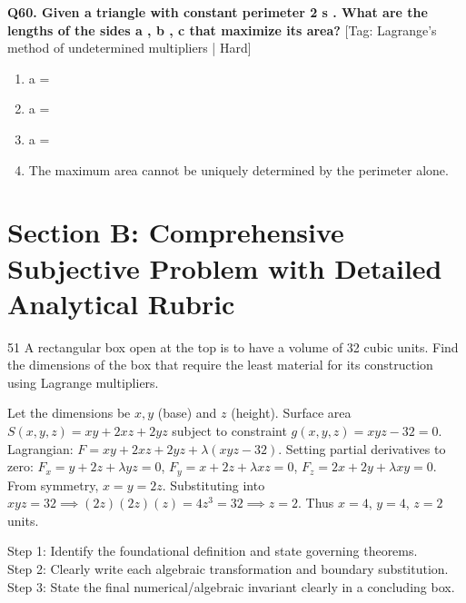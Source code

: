 \noindent\textbf{Q60. Given a triangle with constant perimeter 2 s . What are the lengths of the sides a , b , c that maximize its area?} \hfill [Tag: Lagrange's method of undetermined multipliers | Hard]
\begin{enumerate}[label=(\alph*),topsep=2pt,itemsep=1pt,partopsep=0pt,parsep=0pt]
    \item {{a =}}
    \item {{a =}}
    \item {{a =}}
    \item {{The maximum area cannot be uniquely determined by the perimeter alone.}}
\end{enumerate}
\vspace{2mm}


\section{Section B: Comprehensive Subjective Problem with Detailed Analytical Rubric}

\begin{subjectiveq}{5}{1}
A rectangular box open at the top is to have a volume of 32 cubic units. Find the dimensions of the box that require the least material for its construction using Lagrange multipliers.
\end{subjectiveq}

\begin{solbox}
Let the dimensions be $x, y$ (base) and $z$ (height). Surface area $S(x,y,z) = xy + 2xz + 2yz$ subject to constraint $g(x,y,z) = xyz - 32 = 0$. Lagrangian: $F = xy + 2xz + 2yz + \lambda(xyz - 32)$. Setting partial derivatives to zero: $F_x = y + 2z + \lambda yz = 0$, $F_y = x + 2z + \lambda xz = 0$, $F_z = 2x + 2y + \lambda xy = 0$. From symmetry, $x = y = 2z$. Substituting into $xyz = 32 \implies (2z)(2z)(z) = 4z^3 = 32 \implies z = 2$. Thus $x = 4$, $y = 4$, $z = 2$ units.
\end{solbox}

\begin{examinertip}
Step 1: Identify the foundational definition and state governing theorems.\\
Step 2: Clearly write each algebraic transformation and boundary substitution.\\
Step 3: State the final numerical/algebraic invariant clearly in a concluding box.
\end{examinertip}
